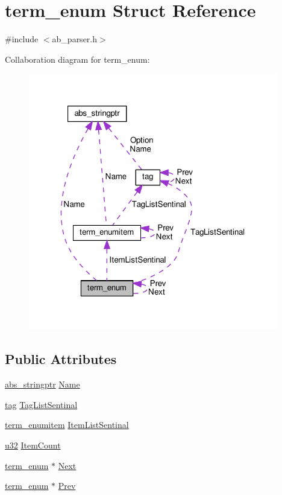 \hypertarget{structterm__enum}{}\section{term\+\_\+enum Struct Reference}
\label{structterm__enum}


{\ttfamily \#include $<$ab\+\_\+parser.\+h$>$}



Collaboration diagram for term\+\_\+enum\+:\nopagebreak
\begin{figure}[H]
\begin{center}
\leavevmode
\includegraphics[width=309pt]{d6/d82/structterm__enum__coll__graph}
\end{center}
\end{figure}
\subsection*{Public Attributes}
\begin{DoxyCompactItemize}
\item 
\hyperlink{structabs__stringptr}{abs\+\_\+stringptr} \hyperlink{structterm__enum_a41929255cd1231f08655f7440bd2051f}{Name}
\item 
\hyperlink{structtag}{tag} \hyperlink{structterm__enum_a064766a8666ff84a4571dff4d9a7070a}{Tag\+List\+Sentinal}
\item 
\hyperlink{structterm__enumitem}{term\+\_\+enumitem} \hyperlink{structterm__enum_a982f44fe4692493e3456a80b50805d64}{Item\+List\+Sentinal}
\item 
\hyperlink{ab__common_8h_afaa62991928fb9fb18ff0db62a040aba}{u32} \hyperlink{structterm__enum_a90cb3e473c1ca0a59037e3882af7a1bc}{Item\+Count}
\item 
\hyperlink{structterm__enum}{term\+\_\+enum} $\ast$ \hyperlink{structterm__enum_aa66270184b4f4d6457dda0afd18e25fc}{Next}
\item 
\hyperlink{structterm__enum}{term\+\_\+enum} $\ast$ \hyperlink{structterm__enum_addad4748b3a035a56ed83b5389668f35}{Prev}
\end{DoxyCompactItemize}


